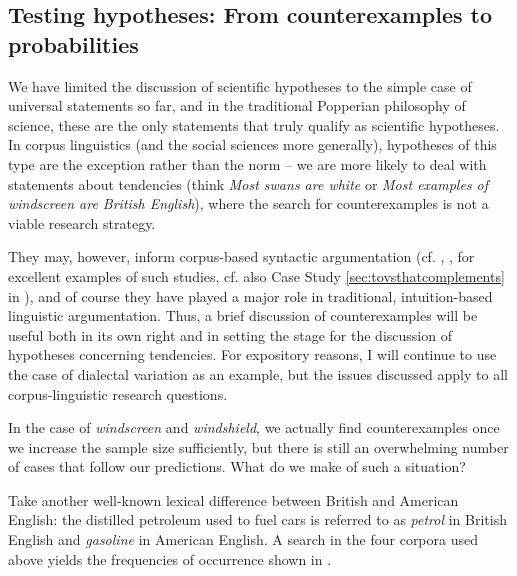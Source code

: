 \subsection{Testing hypotheses: From counterexamples to probabilities}
\label{sec:testinghypotheses}

We have limited the discussion of scientific hypotheses  to the simple case of universal statements so far, and in the traditional Popperian philosophy of science, these are the only statements that truly qualify as scientific hypotheses. In corpus linguistics (and the social sciences more generally), hypotheses of this type are the exception rather than the norm -- we are more likely to deal with statements about tendencies (think \emph{Most swans are white} or \emph{Most examples of \textit{windscreen} are British  English}), where the search for counterexamples  is not a viable research strategy.

They may, however, inform corpus\hyp{}based syntactic  argumentation (cf. \citet{meurers_use_2005}, \citet{meurers_corpora_2009}, \citet{rohdenburg_is_2003} for excellent examples of such studies, cf. also Case Study \ref{sec:tovsthatcomplements} in ), and of course they have played a major role in traditional, intuition\hyp{}based  linguistic argumentation. Thus, a brief discussion of counterexamples  will be useful both in its own right and in setting the stage for the discussion of hypotheses  concerning tendencies. For expository reasons, I will continue to use the case of dialectal variation  as an example, but the issues discussed apply to all corpus\hyp{}linguistic research questions.

In the case of \textit{windscreen} and \textit{windshield}, we actually find counterexamples  once we increase the sample  size  sufficiently, but there is still an overwhelming number of cases that follow our predictions. What do we make of such a situation?

Take another well\hyp{}known lexical difference between British  and American  English: the distilled petroleum used to fuel cars is referred to as \textit{petrol} in British English and \textit{gasoline} in American English. A search in the four corpora used above yields the frequencies  of occurrence shown in .

